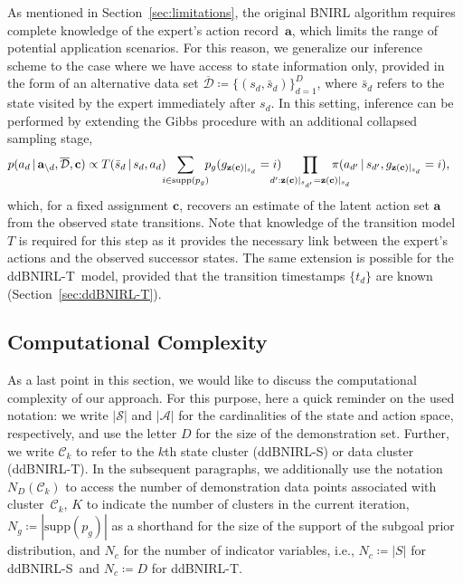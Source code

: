 \documentclass[twoside,11pt]{article}
\newcommand{\p}{p}
\newcommand{\given}{\,\vert\,}
\newcommand{\supp}{\text{supp}}
\newcommand{\softmax}{{\pi}}
\newcommand{\without}{\backslash}
\newcommand{\defeq}{\coloneqq}
\newcommand{\eqkomma}{,}
\newcommand{\ie}{i.e.}
\newcommand{\ddBNIRLS}{\mbox{ddBNIRL-S}}
\newcommand{\ddBNIRLT}{\mbox{ddBNIRL-T}}
\begin{document}
As mentioned in Section~\ref{sec:limitations}, the original BNIRL algorithm requires complete knowledge of the expert's action record~$\mathbf{a}$, which limits the range of potential application scenarios. For this reason, we generalize our inference scheme to the case where we have access to  %
%
state information only, provided in the form of an alternative data set
%
$\mathcal{\overline{D}} \defeq \{ (s_d,\bar{s}_d)\}_{d=1}^D$, %
%
where $\bar{s}_d$ refers to the state visited by the expert immediately after $s_d$. In this setting, inference can be performed by extending the Gibbs procedure with an additional collapsed sampling %
stage,
\begin{align}
	\p(a_d \given \mathbf{a}_{\without d}, \overline{\mathcal{D}}, \mathbf{c}) &\propto T(\bar{s}_d \given s_d, a_d) \!\!\! \sum_{i\in\supp(p_g)} \!\!\! \p_g(g_{\mathbf{z}(\mathbf{c})|_{s_d}}=i)  \hspace{-0.4cm} \prod_{d': \mathbf{z}(\mathbf{c})|_{s_{d'}} = \mathbf{z}(\mathbf{c})|_{s_{d}}} \hspace{-4ex} \softmax(a_{d'} \given s_{d'}, g_{\mathbf{z}(\mathbf{c})|_{s_d}}=i) \eqkomma
	\label{eq:actionSampling}
\end{align}
which, for a fixed assignment $\mathbf{c}$, recovers an estimate of the latent action %
set $\mathbf{a}$ from the observed state transitions. %
Note that knowledge of the transition model $T$ is required for this step as it provides the necessary link between the %
expert's actions and the observed successor states. The same extension is possible for the \ddBNIRLT\ model, provided that the transition timestamps $\{t_d\}$ are known (Section~\ref{sec:ddBNIRL-T}).



\subsection{Computational Complexity}
\label{sec:complexity}
As a last point in this section, we would like to discuss the computational complexity of our approach. %
For this purpose, here a quick reminder on the used notation: we write $|\mathcal{S}|$ and $|\mathcal{A}|$ for the cardinalities of the state and action space, respectively, and use the letter $D$ for the size of the demonstration set. Further, we write $\mathcal{C}_k$ to refer to the $k$th state cluster (ddBNIRL-S) or data cluster (ddBNIRL-T). In the subsequent paragraphs, we additionally use the notation $N_{D}(\mathcal{C}_k)$ to access the number of demonstration data points associated with cluster~$\mathcal{C}_k$, $K$ to indicate the number of clusters in the current iteration, $N_g\defeq|\supp(p_g)|$ as a shorthand for the size of the support of the subgoal prior distribution, and $N_c$ for the number of indicator variables, \ie, $N_c\defeq|S|$ for \ddBNIRLS\  and $N_c\defeq D$ for ddBNIRL-T.\\
\end{document}
